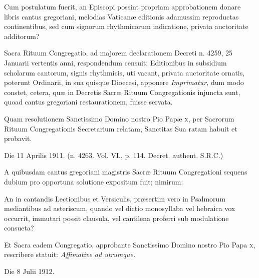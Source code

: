 \documentclass[vesperale_romanum.tex]{subfiles}
\begin{document}
\myrule

{\centering{}\par} %

{}

Cum postulatum fuerit, an Episcopi possint propriam approbationem donare libris cantus gregoriani, melodias Vaticanæ editionis adamussim reproductas continentibus, sed cum signorum rhythmicorum indicatione, privata auctoritate additorum?

Sacra Rituum Congregatio, ad majorem declarationem Decreti n. 4259, 25 Januarii vertentis anni, respondendum censuit:
Editionibus in subsidium scholarum cantorum, signis rhythmicis, uti vacant, privata auctoritate ornatis, poterunt Ordinarii, in sua quisque Dioecesi, apponere \textit{Imprimatur,} dum modo constet, cetera, quæ in Decretis Sacræ Rituum Congregationis injuncta sunt, quoad cantus gregoriani restaurationem, fuisse servata.

Quam resolutionem Sanctissimo Domino nostro Pio Papæ \textsc{x}, per Sacrorum Rituum Congregationis Secretarium relatam, Sanctitas Sua ratam habuit et probavit.

Die 11 Aprilis 1911. {\hfill(n. 4263. Vol. VI., p. 114. Decret. authent. S.R.C.)}
\vspace{5ex}%

{\centering{}\par} %

{}

A quibusdam cantus gregoriani magistris Sacræ Rituum Congregationi sequens dubium pro opportuna solutione expositum fuit; nimirum:

An in cantandis Lectionibus et Versiculis, præsertim vero in Psalmorum mediantibus ad asteriscum, quando vel dictio monosyllaba vel hebraica vox occurrit, immutari possit clausula, vel cantilena proferri sub modulatione consueta?

Et Sacra eadem Congregatio, approbante Sanctissimo Domino nostro Pio Papa \textsc{x}, rescribere statuit: \textit{Affimative ad utrumque.}

Die 8 Julii 1912.
\end{document}
